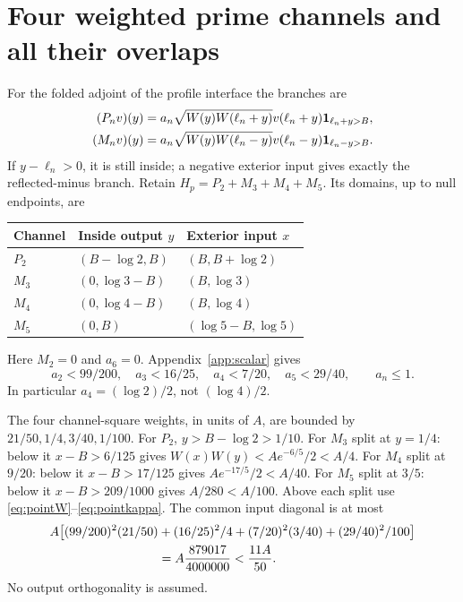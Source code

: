 \documentclass[11pt,a4paper]{article}
\numberwithin{equation}{section}
\theoremstyle{remark}\newtheorem{remark}[theorem]{Remark}
\begin{document}
\section{Four weighted prime channels and all their overlaps}\label{sec:weightedprime}
For the folded adjoint of the profile interface the branches are
\begin{align*}
 (P_nv)(y)&=a_n\sqrt{W(y)W(\ell_n+y)}v(\ell_n+y)\mathbf1_{\ell_n+y>B},\\
 (M_nv)(y)&=a_n\sqrt{W(y)W(\ell_n-y)}v(\ell_n-y)\mathbf1_{\ell_n-y>B}.
\end{align*}
If $y-\ell_n>0$, it is still inside; a negative exterior input gives exactly the reflected-minus branch. Retain $H_p=P_2+M_3+M_4+M_5$. Its domains, up to null endpoints, are
\begin{center}\small
\begin{tabular}{@{}lll@{}}\toprule
Channel & Inside output $y$ & Exterior input $x$\\\midrule
$P_2$ & $(B-\log2,B)$ & $(B,B+\log2)$\\
$M_3$ & $(0,\log3-B)$ & $(B,\log3)$\\
$M_4$ & $(0,\log4-B)$ & $(B,\log4)$\\
$M_5$ & $(0,B)$ & $(\log5-B,\log5)$\\\bottomrule
\end{tabular}
\end{center}
Here $M_2=0$ and $a_6=0$. Appendix~\ref{app:scalar} gives
\begin{equation}\label{eq:coefficientcaps}
 a_2<99/200,\quad a_3<16/25,\quad a_4<7/20,\quad a_5<29/40,
 \qquad a_n\le1.
\end{equation}
In particular $a_4=(\log2)/2$, not $(\log4)/2$.

The four channel-square weights, in units of $A$, are bounded by
$21/50,1/4,3/40,1/100$. For $P_2$, $y>B-\log2>1/10$.
For $M_3$ split at $y=1/4$: below it $x-B>6/125$ gives
$W(x)W(y)<Ae^{-6/5}/2<A/4$.
For $M_4$ split at $9/20$: below it $x-B>17/125$ gives $Ae^{-17/5}/2<A/40$.
For $M_5$ split at $3/5$: below it $x-B>209/1000$ gives $A/280<A/100$.
Above each split use \eqref{eq:pointW}--\eqref{eq:pointkappa}.
The common input diagonal is at most
\begin{align}
 A\bigl[(99/200)^2(21/50)&+(16/25)^2/4
 +(7/20)^2(3/40)+(29/40)^2/100\bigr]\notag\\
 &=A\frac{879017}{4000000}<\frac{11A}{50}.\label{eq:weighteddiag}
\end{align}
No output orthogonality is assumed.
\end{document}
